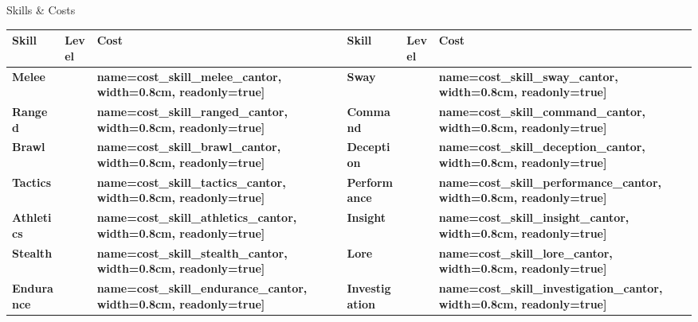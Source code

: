 \documentclass[10pt]{article}
\newcommand{\skilldots}[1]{%
  \TextField[
    name=#1,
    bordercolor={0 0 0},
    backgroundcolor={255 255 255},
    readonly=false,
    width=1.5cm,
    height=0.45cm,
    maxlen=1,
    chars=2,
    align=0,
    default=0
  ]{}%
  \hspace{-0.2em}%
  \raisebox{0.4ex}{%
    \small%
    \textcolor{gray}{%
      \(\bigcirc\)\(\bigcirc\)\(\bigcirc\)\(\bigcirc\)\(\bigcirc\)%
    }%
  }%
}
\newcommand{\tf}[1]{\TextField[#1]{}}
\begin{document}
\begin{Form}
\begin{minipage}[t]{0.48\linewidth}
    \vspace{0.5em}
    
    \begin{charbox}{Skills \& Costs}
        \begin{tabular}{>{\bfseries}p{2.5cm} >{\bfseries}p{1.5cm} >{\bfseries}p{1.5cm} >{\bfseries}p{2.5cm} >{\bfseries}p{1.5cm} >{\bfseries}p{1.5cm}}
            \toprule
            \textbf{Skill} & \textbf{Level} & \textbf{Cost} & \textbf{Skill} & \textbf{Level} & \textbf{Cost} \\
            \midrule
            Melee & \skilldots{skill_melee_cantor} & \tf[name=cost_skill_melee_cantor, width=0.8cm, readonly=true]{} & 
            Sway & \skilldots{skill_sway_cantor} & \tf[name=cost_skill_sway_cantor, width=0.8cm, readonly=true]{} \\
            Ranged & \skilldots{skill_ranged_cantor} & \tf[name=cost_skill_ranged_cantor, width=0.8cm, readonly=true]{} & 
            Command & \skilldots{skill_command_cantor} & \tf[name=cost_skill_command_cantor, width=0.8cm, readonly=true]{} \\
            Brawl & \skilldots{skill_brawl_cantor} & \tf[name=cost_skill_brawl_cantor, width=0.8cm, readonly=true]{} & 
            Deception & \skilldots{skill_deception_cantor} & \tf[name=cost_skill_deception_cantor, width=0.8cm, readonly=true]{} \\
            Tactics & \skilldots{skill_tactics_cantor} & \tf[name=cost_skill_tactics_cantor, width=0.8cm, readonly=true]{} & 
            Performance & \skilldots{skill_performance_cantor} & \tf[name=cost_skill_performance_cantor, width=0.8cm, readonly=true]{} \\
            Athletics & \skilldots{skill_athletics_cantor} & \tf[name=cost_skill_athletics_cantor, width=0.8cm, readonly=true]{} & 
            Insight & \skilldots{skill_insight_cantor} & \tf[name=cost_skill_insight_cantor, width=0.8cm, readonly=true]{} \\
            Stealth & \skilldots{skill_stealth_cantor} & \tf[name=cost_skill_stealth_cantor, width=0.8cm, readonly=true]{} & 
            Lore & \skilldots{skill_lore_cantor} & \tf[name=cost_skill_lore_cantor, width=0.8cm, readonly=true]{} \\
            Endurance & \skilldots{skill_endurance_cantor} & \tf[name=cost_skill_endurance_cantor, width=0.8cm, readonly=true]{} & 
            Investigation & \skilldots{skill_investigation_cantor} & \tf[name=cost_skill_investigation_cantor, width=0.8cm, readonly=true]{} \\

\end{tabular}
\end{charbox}
\end{minipage}
\end{Form}
\end{document}
